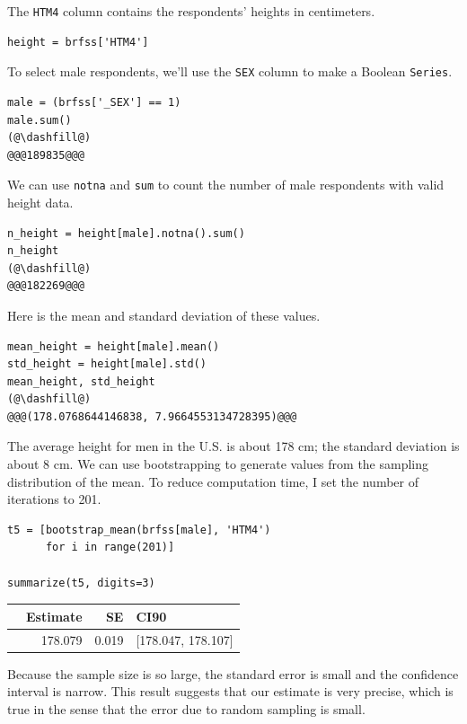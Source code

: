 The \passthrough{\lstinline!HTM4!} column contains the respondents'
heights in centimeters.

\begin{lstlisting}[]
height = brfss['HTM4']
\end{lstlisting}

To select male respondents, we'll use the \passthrough{\lstinline!SEX!}
column to make a Boolean \passthrough{\lstinline!Series!}.

\begin{lstlisting}[]
male = (brfss['_SEX'] == 1)
male.sum()
(@\dashfill@)
@@@189835@@@
\end{lstlisting}

We can use \passthrough{\lstinline!notna!} and
\passthrough{\lstinline!sum!} to count the number of male respondents
with valid height data.

\begin{lstlisting}[]
n_height = height[male].notna().sum()
n_height
(@\dashfill@)
@@@182269@@@
\end{lstlisting}

Here is the mean and standard deviation of these values.

\begin{lstlisting}[]
mean_height = height[male].mean()
std_height = height[male].std()
mean_height, std_height
(@\dashfill@)
@@@(178.0768644146838, 7.9664553134728395)@@@
\end{lstlisting}

The average height for men in the U.S. is about 178 cm; the standard
deviation is about 8 cm. We can use bootstrapping to generate values
from the sampling distribution of the mean. To reduce computation time,
I set the number of iterations to 201.

\begin{lstlisting}[]
t5 = [bootstrap_mean(brfss[male], 'HTM4')
      for i in range(201)]

summarize(t5, digits=3)
\end{lstlisting}

\begin{tabular}{lrrl}
\midrule
{} &  Estimate &     SE &                CI90 \\
\midrule
{} &   178.079 &  0.019 &  [178.047, 178.107] \\
\midrule
\end{tabular}

Because the sample size is so large, the standard error is small and the
confidence interval is narrow. This result suggests that our estimate is
very precise, which is true in the sense that the error due to random
sampling is small.

